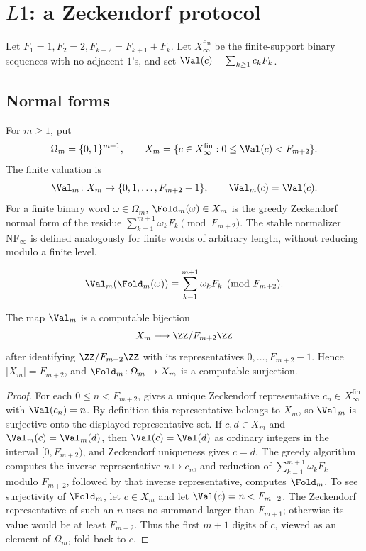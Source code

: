 \section{\texorpdfstring{\(L1\)}{L1}: a Zeckendorf protocol}\label{sec:L1}

Let \(F_1=1,F_2=2,F_{k+2}=F_{k+1}+F_k\).  Let
\(X_\infty^{\mathrm{fin}}\) be the finite-support binary sequences with no
adjacent \(1\)'s, and set
\(\Val(c)=\sum_{k\ge1}c_kF_k\).

\subsection{Normal forms}\label{ssec:fold}

\begin{definition}\label{def:fold}
For \(m\ge1\), put
\[
  \Omega_m=\{0,1\}^{m+1},
  \qquad
  X_m=\{c\in X_\infty^{\mathrm{fin}}:0\le \Val(c)<F_{m+2}\}.
\]
The finite valuation is
\[
  \Val_m\colon X_m\to \{0,1,\ldots,F_{m+2}-1\},
  \qquad \Val_m(c)=\Val(c).
\]
For a finite binary word \(\omega\in\Omega_m\), \(\Fold_m(\omega)\in X_m\) is
the greedy Zeckendorf normal form of the residue
\(\sum_{k=1}^{m+1}\omega_kF_k\pmod {F_{m+2}}\).  The stable normalizer
\(\mathrm{NF}_\infty\) is defined analogously for finite words of arbitrary
length, without reducing modulo a finite level.
\end{definition}

\begin{equation}\label{eq:fold-residue}
  \Val_m(\Fold_m(\omega))\equiv\sum_{k=1}^{m+1}\omega_kF_k\pmod {F_{m+2}} .
\end{equation}

\begin{proposition}
\label{prop:finite-zeckendorf-residue-interface}
The map \(\Val_m\) is a computable bijection
\[
  X_m\longrightarrow \ZZ/F_{m+2}\ZZ
\]
after identifying \(\ZZ/F_{m+2}\ZZ\) with its representatives
\(0,\ldots,F_{m+2}-1\).  Hence \(|X_m|=F_{m+2}\), and
\(\Fold_m\colon\Omega_m\to X_m\) is a computable surjection.
\end{proposition}

\begin{proof}
For each \(0\le n<F_{m+2}\),  gives a
unique Zeckendorf representative \(c_n\in X_\infty^{\mathrm{fin}}\) with
\(\Val(c_n)=n\).  By definition this representative belongs to \(X_m\), so
\(\Val_m\) is surjective onto the displayed representative set.  If
\(c,d\in X_m\) and \(\Val_m(c)=\Val_m(d)\), then \(\Val(c)=\Val(d)\) as ordinary
integers in the interval \([0,F_{m+2})\), and Zeckendorf uniqueness gives
\(c=d\).  The greedy algorithm computes the inverse representative
\(n\mapsto c_n\), and reduction of \(\sum_{k=1}^{m+1}\omega_kF_k\) modulo
\(F_{m+2}\), followed by that inverse representative, computes \(\Fold_m\).  To
see surjectivity of \(\Fold_m\), let \(c\in X_m\) and let
\(\Val(c)=n<F_{m+2}\).  The Zeckendorf representative of such an \(n\) uses no
summand larger than \(F_{m+1}\); otherwise its value would be at least
\(F_{m+2}\).  Thus the first \(m+1\) digits of \(c\), viewed as an element of
\(\Omega_m\), fold back to \(c\).
\end{proof}

